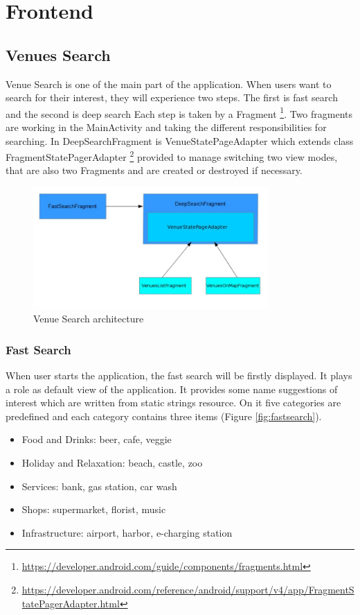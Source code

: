 \section{Frontend}
\label{sec:frontend}

\subsection{Venues Search}
Venue Search is one of the main part of the application. When users want to search for their interest, they will experience two steps. The first is fast search and the second is deep search
Each step is taken by a Fragment \footnote{\url{https://developer.android.com/guide/components/fragments.html}}. Two fragments are working in the MainActivity and taking the different responsibilities for searching. In DeepSearchFragment is VenueStatePageAdapter which extends class FragmentStatePagerAdapter  \footnote{\url{https://developer.android.com/reference/android/support/v4/app/FragmentStatePagerAdapter.html}} provided  to manage switching two view modes, that are also two Fragments and are created or destroyed if necessary.
\begin{figure}[htbp]
	\includegraphics[width=0.8\textwidth]{images/venue_search.jpg}
	\centering
	\caption[]{Venue Search architecture}
	\label{fig:venue_search}
\end{figure}
\subsubsection{Fast Search}
When user starts the application, the fast search will be firstly displayed. It plays a role as default view of the application. It provides some name suggestions of interest which are written from static strings resource. On it five categories are predefined and each category contains three items (Figure \ref{fig:fastsearch}).
\begin{itemize}
	 \item Food and Drinks: beer, cafe, veggie
	 \item Holiday and Relaxation: beach, castle, zoo
	 \item Services: bank, gas station, car wash
	 \item Shops: supermarket, florist, music
	 \item Infrastructure: airport, harbor, e-charging station
\end{itemize}

